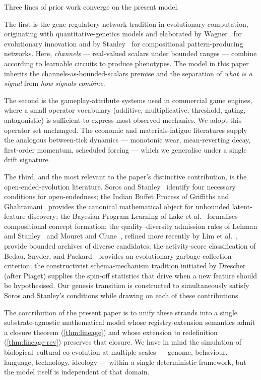 \documentclass[journal,onecolumn,11pt]{IEEEtran}
\theoremstyle{definition}
\begin{document}
Three lines of prior work converge on the present model.

The first is the gene-regulatory-network tradition in evolutionary computation, originating with quantitative-genetics models and elaborated by Wagner~\cite{wagner2011} for evolutionary innovation and by Stanley~\cite{stanley2007} for compositional pattern-producing networks. Here, \emph{channels} --- real-valued scalars under bounded ranges --- combine according to learnable circuits to produce phenotypes. The model in this paper inherits the channels-as-bounded-scalars premise and the separation of \emph{what is a signal} from \emph{how signals combine}.

The second is the gameplay-attribute systems used in commercial game engines, where a small operator vocabulary (additive, multiplicative, threshold, gating, antagonistic) is sufficient to express most observed mechanics. We adopt this operator set unchanged. The economic and materials-fatigue literatures supply the analogous between-tick dynamics --- monotonic wear, mean-reverting decay, first-order momentum, scheduled forcing --- which we generalise under a single drift signature.

The third, and the most relevant to the paper's distinctive contribution, is the open-ended-evolution literature. Soros and Stanley~\cite{soros2014} identify four necessary conditions for open-endedness; the Indian Buffet Process of Griffiths and Ghahramani~\cite{griffiths2011} provides the canonical mathematical object for unbounded latent-feature discovery; the Bayesian Program Learning of Lake et al.~\cite{lake2015} formalises compositional concept formation; the quality--diversity admission rules of Lehman and Stanley~\cite{lehman2011} and Mouret and Clune~\cite{mouret2015}, refined more recently by Lim et al.~\cite{lim2025}, provide bounded archives of diverse candidates; the activity-score classification of Bedau, Snyder, and Packard~\cite{bedau1998} provides an evolutionary garbage-collection criterion; the constructivist schema-mechanism tradition initiated by Drescher~\cite{drescher1991} (after Piaget) supplies the spin-off statistics that drive when a new feature should be hypothesised. Our genesis transition is constructed to simultaneously satisfy Soros and Stanley's conditions while drawing on each of these contributions.

The contribution of the present paper is to unify these strands into a single substrate-agnostic mathematical model whose registry-extension semantics admit a closure theorem (\cref{thm:lineage}) and whose extension to redefinition (\cref{thm:lineage-rev}) preserves that closure. We have in mind the simulation of biological--cultural co-evolution at multiple scales --- genome, behaviour, language, technology, ideology --- within a single deterministic framework, but the model itself is independent of that domain.
\end{document}
